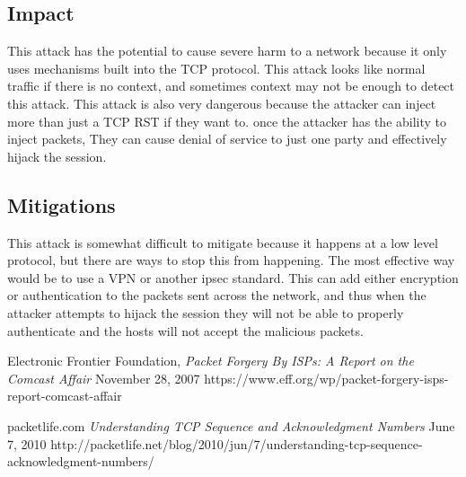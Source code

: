 \documentclass{article}
\begin{document}
\subsection{Impact}
This attack has the potential to cause severe harm to a network because it only
uses mechanisms built into the TCP protocol. This attack looks like normal traffic
if there is no context, and sometimes context may not be enough to detect this
attack. This attack is also very dangerous because the attacker can inject more than
just a TCP RST if they want to. once the attacker has the ability to inject packets,
They can cause denial of service to just one party and effectively hijack the session.

\subsection{Mitigations}
This attack is somewhat difficult to mitigate because it happens at a low level 
protocol, but there are ways to stop this from happening. The most effective way
would be to use a VPN or another ipsec standard. This can add either encryption
or authentication to the packets sent across the network, and thus when the 
attacker attempts to hijack the session they will not be able to properly
authenticate and the hosts will not accept the malicious packets.


\begin{thebibliography}{1}
        Electronic Frontier Foundation, 
        {\em Packet Forgery By ISPs: A Report on the Comcast Affair} 
        November 28, 2007
        https://www.eff.org/wp/packet-forgery-isps-report-comcast-affair

        packetlife.com
        {\em Understanding TCP Sequence and Acknowledgment Numbers}
        June 7, 2010
        http://packetlife.net/blog/2010/jun/7/understanding-tcp-sequence-acknowledgment-numbers/
\end{thebibliography}
\end{document}
